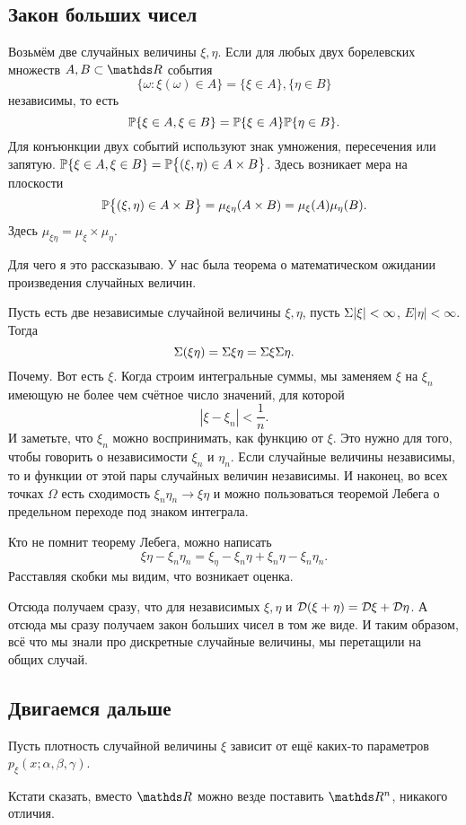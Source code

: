 \subsection{Закон больших чисел}
Возьмём две случайных величины $\xi,\eta$. Если для любых двух борелевских множеств $A,B\subset \R$ события
\[
  \big\{\omega\colon \xi(\omega)\in A\big\} = \{\xi\in A\}, \{\eta\in B\}
\]  
независимы, то есть
\[
  \P\{\xi\in A,\xi\in B\} = \P\{\xi\in A\}\P\{\eta\in B\}.
\]
Для конъюнкции двух событий используют знак умножения, пересечения или запятую. $\P\{\xi\in A,\xi\in B\} = \P\big\{(\xi,\eta)\in A\times B\big\}$. Здесь возникает мера на плоскости
\[
  \P\big\{(\xi,\eta)\in A\times B\big\} = \mu_{\xi\eta}(A\times B) = \mu_\xi(A)\mu_\eta(B).
\]
Здесь $\mu_{\xi\eta} = \mu_\xi\times\mu_\eta$.

Для чего я это рассказываю. У нас была теорема о математическом ожидании произведения случайных величин.

Пусть есть две независимые случайной величины $\xi,\eta$, пусть $\E|\xi|<\infty$, $E|\eta|<\infty$. Тогда
\[
  \E(\xi\eta) = \E\xi\eta = \E\xi\E\eta.
\]
Почему. Вот есть $\xi$. Когда строим интегральные суммы, мы заменяем $\xi$ на $\xi_n$ имеющую не более чем счётное число значений, для которой
\[
  |\xi- \xi_n|<\frac1n.
\]
И заметьте, что $\xi_n$ можно воспринимать, как функцию от $\xi$. Это нужно для того, чтобы говорить о независимости $\xi_n$ и $\eta_n$. Если случайные величины независимы, то и функции от этой пары случайных величин независимы. И наконец, во всех точках $\Omega$ есть сходимость $\xi_n\eta_n\to \xi\eta$ и можно пользоваться теоремой Лебега о предельном переходе под знаком интеграла.

Кто не помнит теорему Лебега, можно написать
\[
  \xi\eta - \xi_n\eta_n = \xi_\eta - \xi_n\eta + \xi_n\eta - \xi_n\eta_n.
\]
Расставляя скобки мы видим, что возникает оценка.

Отсюда получаем сразу, что для независимых $\xi,\eta$ и $\D(\xi+\eta) = \D\xi +\D\eta$. А отсюда мы сразу получаем закон больших чисел в том же виде.
И таким образом, всё что мы знали про дискретные случайные величины, мы перетащили на общих случай.
\subsection{Двигаемся дальше}
Пусть плотность случайной величины $\xi$ зависит от ещё каких-то параметров $p_\xi(x;\alpha,\beta,\gamma)$.

Кстати сказать, вместо $\R$ можно везде поставить $\R^n$, никакого отличия.

